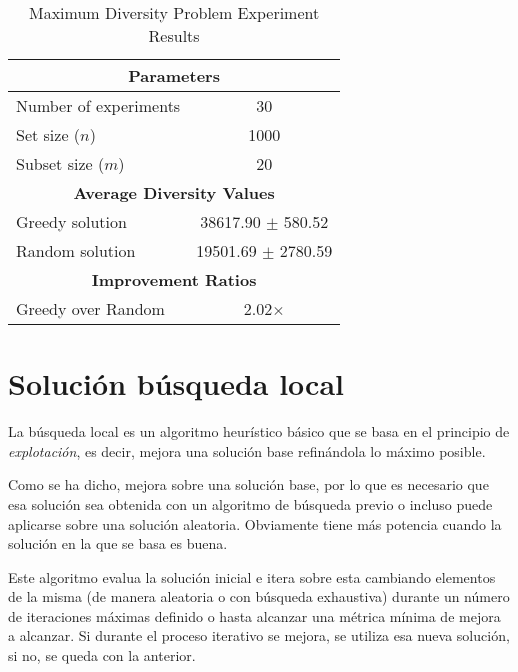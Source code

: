 \documentclass[12pt,letterpaper]{article}
\begin{document}
\begin{table}[htp]
    \centering
    \begin{tabular}{l c}
        \hline
        \multicolumn{2}{c}{\textbf{Parameters}} \\
        \hline
        Number of experiments & 30 \\
        Set size ($n$) & 1000 \\
        Subset size ($m$) & 20 \\
        \hline
        \multicolumn{2}{c}{\textbf{Average Diversity Values}} \\
        \hline
        Greedy solution & 38617.90 $\pm$ 580.52 \\
        Random solution & 19501.69 $\pm$ 2780.59 \\
        \hline
        \multicolumn{2}{c}{\textbf{Improvement Ratios}} \\
        \hline
        Greedy over Random & 2.02$\times$ \\
        \hline
    \end{tabular}
    \caption{Maximum Diversity Problem Experiment Results}
    \label{tab:mdp_results}
\end{table}

\section{Solución búsqueda local}
La búsqueda local es un algoritmo heurístico básico que se basa en el principio de \textit{explotación}, es decir, mejora una solución base refinándola lo máximo posible. 

Como se ha dicho, mejora sobre una solución base, por lo que es necesario que esa solución sea obtenida con un algoritmo de búsqueda previo o incluso puede aplicarse sobre una solución aleatoria. Obviamente tiene más potencia cuando la solución en la que se basa es buena.

Este algoritmo evalua la solución inicial e itera sobre esta cambiando elementos de la misma (de manera aleatoria o con búsqueda exhaustiva) durante un número de iteraciones máximas definido o hasta alcanzar una métrica mínima de mejora a alcanzar. Si durante el proceso iterativo se mejora, se utiliza esa nueva solución, si no, se queda con la anterior.
\end{document}
